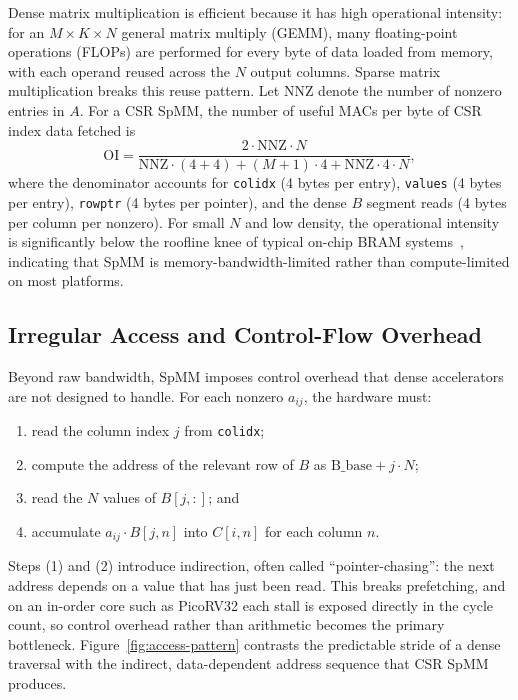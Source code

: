 Dense matrix multiplication is efficient because it has high operational
intensity: for an $M \times K \times N$ general matrix multiply (GEMM), many
floating-point operations (FLOPs) are performed for every byte of data loaded
from memory, with each operand reused across the $N$ output columns. Sparse
matrix multiplication breaks this reuse pattern. Let $\mathrm{NNZ}$ denote the
number of nonzero entries in $A$. For a CSR SpMM, the number of useful MACs per
byte of CSR index data fetched is
\[
  \text{OI} = \frac{2 \cdot \text{NNZ} \cdot N}
                   {\text{NNZ} \cdot (4 + 4) + (M + 1) \cdot 4 + \text{NNZ} \cdot 4 \cdot N},
\]
where the denominator accounts for \texttt{colidx} (4 bytes per entry),
\texttt{values} (4 bytes per entry), \texttt{rowptr} (4 bytes per pointer), and
the dense $B$ segment reads (4 bytes per column per nonzero). For small $N$ and
low density, the operational intensity is significantly below the roofline knee
of typical on-chip BRAM systems~\citep{williams2009roofline}, indicating that
SpMM is memory-bandwidth-limited rather than compute-limited on most platforms.

\subsection{Irregular Access and Control-Flow Overhead}

Beyond raw bandwidth, SpMM imposes control overhead that dense accelerators are
not designed to handle. For each nonzero $a_{ij}$, the hardware must:
\begin{enumerate}
  \item read the column index $j$ from \texttt{colidx};
  \item compute the address of the relevant row of $B$ as $\text{B\_base} + j \cdot N$;
  \item read the $N$ values of $B[j, :]$; and
  \item accumulate $a_{ij} \cdot B[j, n]$ into $C[i, n]$ for each column $n$.
\end{enumerate}
Steps (1) and (2) introduce indirection, often called ``pointer-chasing'':
the next address depends on a value that has just been read. This breaks
prefetching, and on an in-order core such as PicoRV32 each stall is exposed
directly in the cycle count, so control overhead rather than arithmetic
becomes the primary bottleneck. Figure~\ref{fig:access-pattern} contrasts the
predictable stride of a dense traversal with the indirect, data-dependent
address sequence that CSR SpMM produces.

